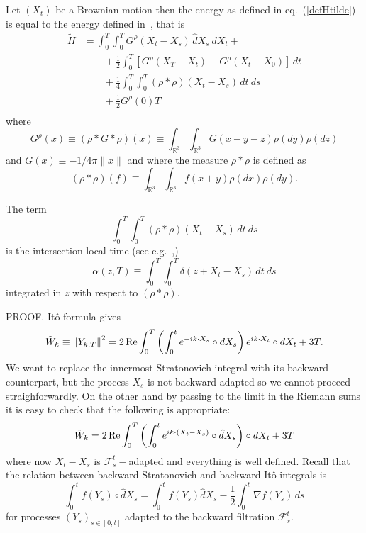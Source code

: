 \begin{theorem}
\label{th:equivalence}
Let $(X_t)$ be a Brownian motion  then the
energy as defined in eq.~(\ref{defHtilde}) is equal to the energy defined
in~\cite{Fl2}, that is
\begin{equation}
\begin{split}
\tilde{H} & =  \int_0^T \!\int_0^T  G^\rho(X_t-X_s)\, \hat{d}X_s~dX_t + \\
& \qquad + \frac{1}{2} \int_0^T \left[G^\rho(X_T-X_t) + G^\rho(X_t-X_0)\right]\, dt \\
& \qquad + \frac{1}{4} \int_0^T\! \int_0^T (\rho * \rho)(X_t-X_s)\, dt~ds \\
& \qquad + \frac{1}{2} G^\rho(0) T \\
\end{split}
\label{equivalence}
\end{equation}
where 
$$
G^\rho(x) \equiv (\rho * G * \rho)(x) \equiv \int_{\mathbb{R}^3} \int_{\mathbb{R}^3} G(x-y-z)
\rho(dy) \rho(dz)
$$
and $G(x) \equiv - 1/4 \pi \|x\|$ and where the
measure $\rho * \rho$ is defined as
$$
(\rho * \rho)(f) \equiv \int_{\mathbb{R}^3} \int_{\mathbb{R}^3} f(x+y) \rho(dx) \rho(dy).
$$
\end{theorem}
\begin{remark}
The term 
$$
 \int_0^T\! \int_0^T (\rho * \rho)(X_t-X_s)\, dt~ds
$$
is the intersection local time (see e.g.~\cite{LeG1},\cite{Yo2})
$$
 \alpha(z, T) \equiv \int_0^T\! \int_0^T \delta(z+X_t-X_s)\, dt~ds
$$
integrated in $z$ with respect to $(\rho * \rho)$.
\end{remark}

PROOF. 
It\^o formula gives
\begin{equation*}
\tilde{W}_k  \equiv  \left\| Y_{k,T} \right\|^2 
 =  
2 \operatorname{Re} \int_0^T \left( \int_0^t e^{-ik \cdot X_s} \circ dX_s \right) e^{ik \cdot X_t}
\circ dX_t + 3 T. 
\end{equation*}
We want to replace the innermost Stratonovich integral with its
backward counterpart, but the process $X_s$ is not backward adapted so we
cannot proceed straighforwardly. On the other hand by passing to the limit in
the Riemann sums it is easy to check that the following is appropriate:
\begin{equation*}
\tilde{W}_k =  
2 \operatorname{Re} \int_0^T \left( \int_0^t e^{ik \cdot (X_t-X_s)} \circ \hat{d}X_s \right) 
\circ dX_t + 3 T
\end{equation*}
where now $X_t-X_s$ is $\mathcal{F}^t_s-$adapted and everything is well defined. 
Recall that the relation between backward Stratonovich and backward
It\^o integrals is
$$
\int_0^t f(Y_s)\circ \hat{d}X_s = \int_0^t f(Y_s)\hat{d}X_s -
\frac{1}{2} \int_0^t \nabla f(Y_s) \,ds
$$
for processes $(Y_s)_{s\in[0,t]}$ adapted to the backward filtration $\mathcal{F}^t_s$.

